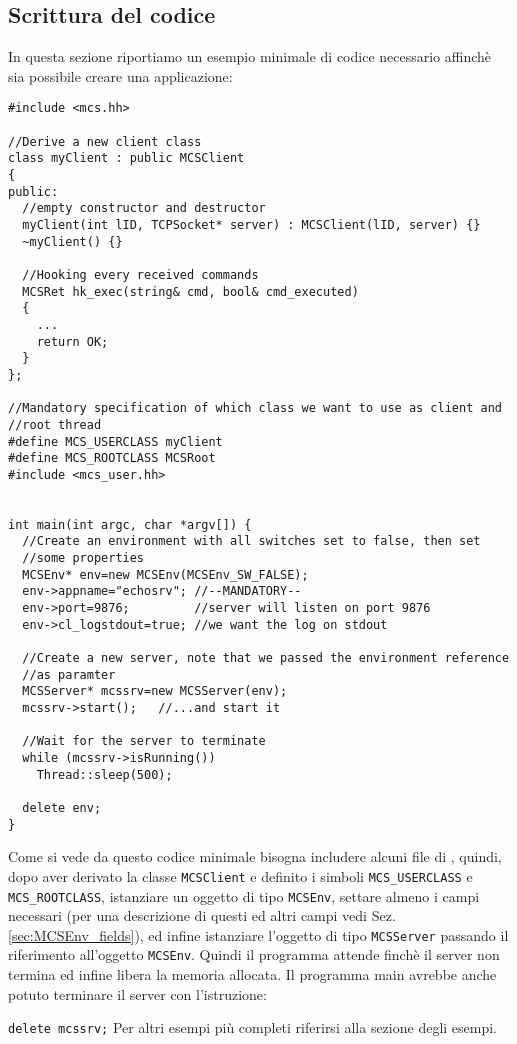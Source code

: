 \subsection{Scrittura del codice}
In questa sezione riportiamo un esempio minimale di codice necessario
affinch\`e sia possibile creare una applicazione:

\begin{verbatim}
#include <mcs.hh>

//Derive a new client class
class myClient : public MCSClient
{
public:
  //empty constructor and destructor
  myClient(int lID, TCPSocket* server) : MCSClient(lID, server) {}
  ~myClient() {}

  //Hooking every received commands
  MCSRet hk_exec(string& cmd, bool& cmd_executed)
  {
    ...
    return OK;
  }
};

//Mandatory specification of which class we want to use as client and
//root thread
#define MCS_USERCLASS myClient
#define MCS_ROOTCLASS MCSRoot
#include <mcs_user.hh>


int main(int argc, char *argv[]) {
  //Create an environment with all switches set to false, then set
  //some properties
  MCSEnv* env=new MCSEnv(MCSEnv_SW_FALSE);
  env->appname="echosrv"; //--MANDATORY--
  env->port=9876;         //server will listen on port 9876
  env->cl_logstdout=true; //we want the log on stdout

  //Create a new server, note that we passed the environment reference
  //as paramter
  MCSServer* mcssrv=new MCSServer(env);
  mcssrv->start();   //...and start it

  //Wait for the server to terminate
  while (mcssrv->isRunning())
    Thread::sleep(500);

  delete env;
}
\end{verbatim}
%
Come si vede da questo codice minimale bisogna includere alcuni file
di \mcs, quindi, dopo aver derivato la classe \verb|MCSClient| e
definito i simboli \verb|MCS_USERCLASS| e \verb|MCS_ROOTCLASS|,
istanziare un oggetto di tipo \verb|MCSEnv|, settare almeno i campi
necessari (per una descrizione di questi ed altri campi vedi
Sez. \ref{sec:MCSEnv_fields}), ed infine istanziare l'oggetto di tipo
\verb|MCSServer| passando il riferimento all'oggetto
\verb|MCSEnv|. Quindi il programma attende finch\`e il server non
termina ed infine libera la memoria allocata. Il programma main
avrebbe anche potuto terminare il server con l'istruzione:

\bigskip
\verb|delete mcssrv;|
\bigskip\newline
%
Per altri esempi pi\`u completi riferirsi alla sezione degli esempi.


